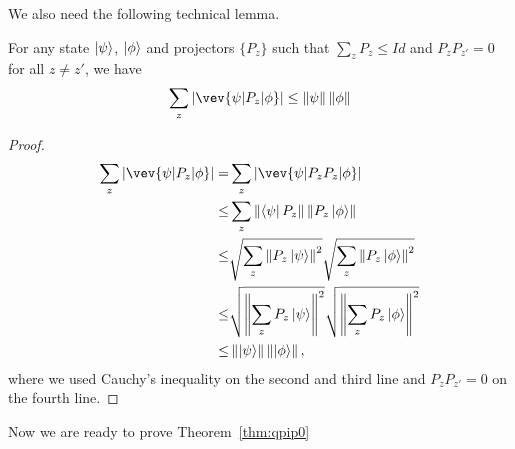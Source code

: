 We also need the following technical lemma.
\begin{lemma}\label{lem:samp-tech}
	For any state $\ket{\psi}$,  $\ket{\phi}$ and projectors $\{P_z\}$ such that $\sum_z P_z \leq Id$ and $P_z P_{z'} =0 $ for all $z\neq z'$, we have
	$$  \sum_z |\vev{\psi|P_z|\phi}| \leq \norm{\psi}\norm{\phi} $$
\end{lemma}
\begin{proof}
	\begin{align}
		\sum_z |\vev{\psi|P_z|\phi}| =&\sum_z|\vev{\psi|P_zP_z|\phi}| \nn \\
		\leq& \sum_z \norm{\bra{\psi}P_z} \norm{ P_z\ket{\phi}} \nn \\
		\leq&  \sqrt{\sum_z \norm{P_z\ket{\psi}}^2} \sqrt{\sum_z\norm{P_z\ket{\phi}}^2} \nn \\
		\leq& \sqrt{\norm{\sum_z P_z\ket{\psi}}^2 } \sqrt{\norm{\sum_z P_z\ket{\phi}}^2 } \nn \\
		\leq & \norm{\ket{\psi}}\norm{\ket{\phi}},
	\end{align}
	where we used Cauchy's inequality on the second and third line and $P_z P_{z'} =0 $ on the fourth line.
\end{proof}

Now we are ready to prove Theorem~\ref{thm:qpip0}


